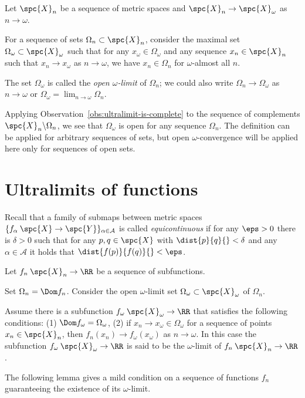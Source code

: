 Let $\spc{X}_n$ be a sequence of metric spaces and $\spc{X}_n\to \spc{X}_\omega$
as $n\to \omega$.

For a sequence of sets $\Omega_n\subset \spc{X}_n$,
consider the maximal set $\Omega_\omega\subset \spc{X}_\omega$ such that 
for any $x_\omega\in\Omega_\omega$ and any sequence $x_n\in\spc{X}_n$ such that $x_n\to x_\omega$ as $n\to \omega$, we have $x_n\in\Omega_n$ for $\omega$-almost all $n$.

The set $\Omega_\omega$ is called the  \emph{open $\omega$-limit} of $\Omega_n$;
we could also write  $\Omega_n\to \Omega_\omega$ as $n\to\omega$ or $\Omega_\omega=\lim_{n\to\omega}\Omega_n$. 

{\sloppy

Applying Observation~\ref{obs:ultralimit-is-complete} to the sequence of complements $\spc{X}_n\backslash \Omega_n$, we see that $\Omega_\omega$ is open for any sequence $\Omega_n$.
The definition can be applied for arbitrary sequences of sets, but  
open $\omega$-convergence  will be applied here only for sequences of open sets.

}

\section{Ultralimits of functions}

Recall that a family of submaps between metric spaces $\{f_\alpha\: \spc{X}\to\spc{Y}\}_{\alpha\in\mathcal A}$ is called \emph{equicontinuous} if for any $\eps>0$ there is $\delta>0$ such that for any $p,q\in\spc{X}$ with $\dist{p}{q}{}<\delta$ and any $\alpha\in\mathcal A$ it holds that $\dist{f(p)}{f(q)}{}<\eps$.

Let $f_n\:\spc{X}_n\to\RR$ be a sequence of subfunctions.

Set $\Omega_n=\Dom f_n$.
Consider the open $\omega$-limit set $\Omega_\omega\subset \spc{X}_\omega$ of $\Omega_n$.

Assume there is a subfunction $f_\omega\:\spc{X}_\omega\to\RR$
that satisfies the following conditions: 
(1) $\Dom f_\omega=\Omega_\omega$, (2) if $x_n\to x_\omega\in \Omega_\omega$ for a sequence of points $x_n\in\spc{X}_n$, then $f_n(x_n)\to f_\omega(x_\omega)$ as $n\to\omega$.
In this case 
the subfunction $f_\omega\:\spc{X}_\omega\to\RR$ 
is said to be the 
$\omega$-limit of $f_n\:\spc{X}_n\to\RR$.

The following lemma gives a mild condition on a sequence of functions $f_n$
guaranteeing the existence of its $\omega$-limit.


